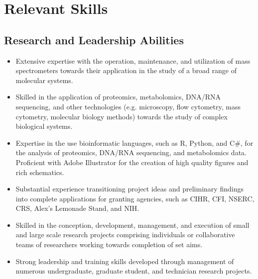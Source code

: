 \documentclass[11pt]{article}
\begin{document}
\section*{Relevant Skills}
\begin{addmargin}[3em]{2em}%
	\subsection*{Research and Leadership Abilities}
	\begin{itemize}
        \item Extensive expertise with the operation, maintenance, and utilization of mass spectrometers towards their application in the study of a broad range of molecular systems. 
        \item Skilled in the application of proteomics, metabolomics, DNA/RNA sequencing, and other technologies (e.g. microscopy, flow cytometry, mass cytometry, molecular biology methods) towards the study of complex biological systems.
        \item Expertise in the use bioinformatic languages, such as R, Python, and C\#, for the analysis of proteomics, DNA/RNA sequencing, and metabolomics data. Proficient with Adobe Illustrator for the creation of high quality figures and rich schematics.
        \item Substantial experience transitioning project ideas and preliminary findings into complete applications for granting agencies, such as CIHR, CFI, NSERC, CRS, Alex's Lemonade Stand, and NIH.		
		\item Skilled in the conception, development, management, and execution of small and large scale research projects comprising individuals or collaborative teams of researchers working towards completion of set aims.
		\item Strong leadership and training skills developed through management of numerous undergraduate, graduate student, and technician research projects.
	\end{itemize}
\end{addmargin}
\end{document}
